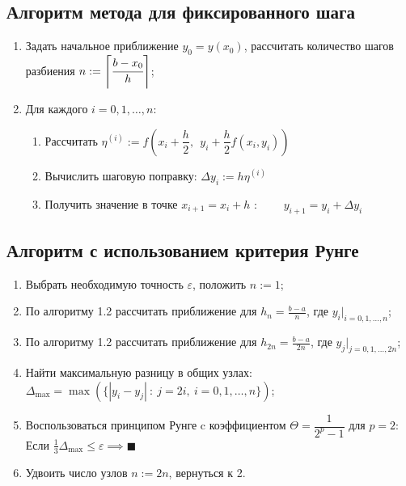 \subsection{Алгоритм метода для фиксированного шага}
\begin{enumerate}
    \item Задать начальное приближение $y_0=y(x_0)$, рассчитать количество шагов разбиения $n:=\left\lceil\cfrac{b-x_0}{h}\right\rceil$;

    \item Для каждого $i=0,1,\ldots,n:$
    \begin{enumerate}
        \item Рассчитать $\eta^{(i)} := f\left(x_i+\dfrac{h}{2},~~ y_i+\dfrac{h}{2}f(x_i,y_i)\right)$

        \item Вычислить шаговую поправку: $\Delta y_i := h \eta^{(i)}$

        \item Получить значение в точке $x_{i+1} = x_i+h$ :~~~~ $y_{i+1} = y_i + \Delta y_i$
    \end{enumerate}
\end{enumerate}

\subsection{Алгоритм с использованием критерия Рунге}

\begin{enumerate}
    \item Выбрать необходимую точность $\varepsilon$, положить $n:=1$;

    \item По алгоритму 1.2 рассчитать приближение для $h_n=\frac{b-a}{n}$, где $y_i|_{i=0,1,\ldots,n}$;

    \item По алгоритму 1.2 рассчитать приближение для $h_{2n}=\frac{b-a}{2n}$, где $y_j|_{j=0,1,\ldots,2n}$;

    \item Найти максимальную разницу в общих узлах: $\Delta_{\max} = \max(\{|y_i-y_j|~:~j=2i,~i=0,1,\ldots,n\})$;

    \item Воспользоваться принципом Рунге c коэффициентом $\Theta=\dfrac{1}{2^p-1}$ для $p=2$:
    Если $\frac{1}{3} \Delta_{\max} \le \varepsilon \implies \blacksquare$

    \item Удвоить число узлов $n:= 2n$, вернуться к 2.
\end{enumerate}

